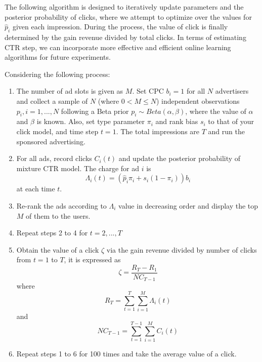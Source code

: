 \documentclass{acm_proc_article-sp}
\begin{document}
The following algorithm is designed to iteratively update parameters and the posterior probability of clicks, where we attempt to optimize over the values for $\hat{p}_{i}$ given each impression. During the process, the value of click is finally determined by the gain revenue divided by total clicks. In terms of estimating CTR step, we can incorporate more effective and efficient online learning algorithms for future experiments.

Considering the following process: 

\begin{enumerate}
    \item The number of ad slots is given as $M$. Set CPC $b_{i}=1$ for all $N$ advertisers and collect a sample of $N$ (where $0<M\leqslant N$) independent observations $p_{i},i=1,...,N$ following a Beta prior $p_{i}\sim Beta(\alpha,\beta)$, where the value of $\alpha$ and $\beta$ is known. Also, set type parameter $\pi_{i}$ and rank bias $s_{i}$ to that of your click model, and time step $t=1$. The total impressions are $T$ and run the sponsored advertising.
    \item For all ads, record clicks $C_{i}(t)$ and update the posterior probability of mixture CTR model. The charge for ad $i$ is
    \begin{equation}
    \Lambda _{i}(t)=(\hat{p}_{i}\pi_{i}+s_{i}(1-\pi_{i}))b_{i}
    \end{equation}
    at each time $t$.
    \item Re-rank the ads according to $\Lambda _{i}$ value in decreasing order and display the top $M$ of them to the users.

    \item Repeat steps 2 to 4 for $t=2,...,T$
    
    \item Obtain the value of a click $\zeta$ via the gain revenue divided by number of clicks from $t=1$ to $T$, it is expressed as
    \begin{equation} 
    \zeta = \frac{R_{T}-R_{1}}{NC_{T-1}} 
    \end{equation}
    where
    \begin{equation} 
    R_{T}=\sum_{t=1}^{T}\sum_{i=1}^{M}\Lambda _{i}(t)
    \end{equation}
    and
    \begin{equation}
    NC_{T-1}=\sum_{t=1}^{T-1}\sum_{i=1}^{M}C_{i}(t)
    \end{equation}
    
    \item Repeat steps 1 to 6 for 100 times and take the average value of a click.
\end{enumerate}
\end{document}

